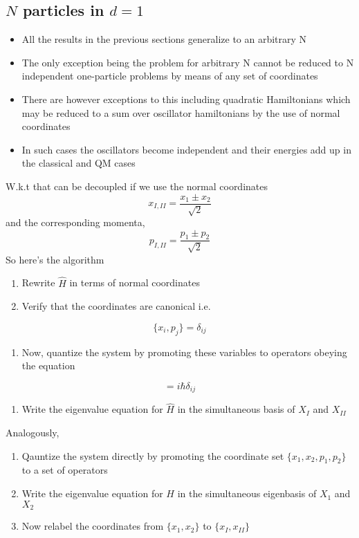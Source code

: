 \subsection{$N$ particles in $d=1$}
\begin{itemize}
\item All the results in the previous sections generalize to an arbitrary N
\item The only exception being the problem for arbitrary N cannot be reduced to N independent one-particle problems by means of any set of coordinates
\item There are however exceptions to this including quadratic Hamiltonians which may be reduced to a sum over oscillator hamiltonians by the use of normal coordinates
\item In such cases the oscillators become independent and their energies add up in the classical and QM cases
\end{itemize}
W.k.t that can be decoupled if we use the normal coordinates
\begin{equation}
	x_{I,II} = \frac{x_{1} \pm x_{2}}{\sqrt{2}}
\end{equation}
and the corresponding momenta,
\begin{equation}
	p_{I,II} = \frac{p_{1} \pm p_{2}}{\sqrt{2}}
\end{equation}
So here's the algorithm
\begin{enumerate}
\item Rewrite $\hat{H}$ in terms of normal coordinates
\item Verify that the coordinates are canonical i.e.
\setcounter{enumTemp}{\theenumi}
\end{enumerate}
\begin{equation}
\{x_{i}, p_{j}\} = \delta_{ij}
\end{equation}
\begin{enumerate}
\setcounter{enumi}{\theenumTemp}
\item Now, quantize the system by promoting these variables to operators obeying the equation
\setcounter{counterr}{\theenumi}
\end{enumerate}
\begin{equation}
[\hat{X}_{i}, \hat{P}_{j}] = i \hbar \delta_{ij}
\end{equation}
\begin{enumerate}
	\setcounter{enumi}{\thecounterr}
\item Write the eigenvalue equation for $\hat{H}$ in the simultaneous basis of $X_{I}$ and $X_{II}$
\end{enumerate}
Analogously,
\begin{enumerate}
\item Qauntize the system directly by promoting the coordinate set $\{x_{1},x_{2},p_{1},p_{2} \}$ to a set of operators
\item Write the eigenvalue equation for $H$ in the simultaneous eigenbasis of $X_{1}$ and $X_{2}$
\item Now relabel the coordinates from $\{x_{1},x_{2}\}$ to $\{x_{I},x_{II}\}$
\end{enumerate}
